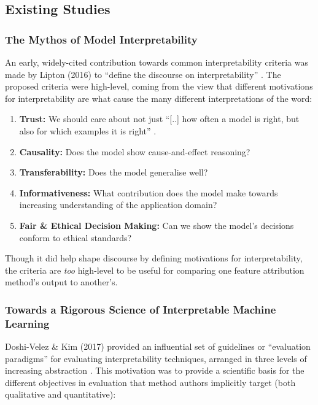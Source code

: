 \documentclass[main]{subfiles}
\begin{document}
\subsection{Existing Studies} \label{sec:existing_studies}

\subsubsection{The Mythos of Model Interpretability \cite{lipton}}
An early, widely-cited contribution towards common interpretability criteria was made by Lipton (2016) to ``define the discourse on interpretability'' \cite{lipton}. The proposed criteria were high-level, coming from the view that different motivations for interpretability are what cause the many different interpretations of the word:

\begin{enumerate}
\item \textbf{Trust:} We should care about not just ``[..] how often a model is right, but also for which examples it is right'' \cite{lipton}.
\item \textbf{Causality:} Does the model show cause-and-effect reasoning?
\item \textbf{Transferability:} Does the model generalise well?
\item \textbf{Informativeness:} What contribution does the model make towards increasing understanding of the application domain?
\item \textbf{Fair \& Ethical Decision Making:} Can we show the model's decisions conform to ethical standards?
\end{enumerate}

Though it did help shape discourse by defining motivations for interpretability, the criteria are \textit{too} high-level to be useful for comparing one feature attribution method's output to another's.

\subsubsection{Towards a Rigorous Science of Interpretable Machine Learning \cite{paradigms}}

Doshi-Velez \& Kim (2017) provided an influential set of guidelines or ``evaluation paradigms'' for evaluating interpretability techniques, arranged in three levels of increasing abstraction \cite{paradigms}. This motivation was to provide a scientific basis for the different objectives in evaluation that method authors implicitly target (both qualitative and quantitative):
\end{document}
